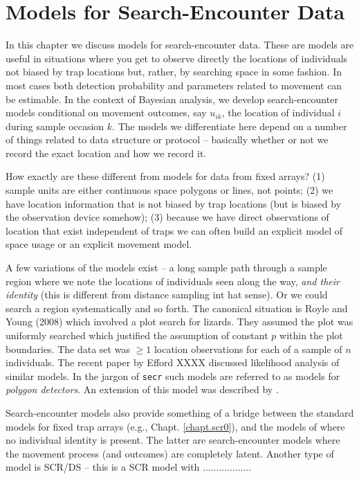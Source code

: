 \chapter{Models for  Search-Encounter Data}
\label{chapt.search-encounter}

\vspace{0.3cm}


In this chapter we discuss models for 
search-encounter data. These are models are useful in situations where
you get to observe directly the locations of 
individuals not biased by trap locations but,
rather, by searching space in some fashion. In most cases both
detection probability and parameters related to movement can be
estimable. In the context of Bayesian analysis, we develop
search-encounter models conditional on 
movement outcomes, say $u_{ik}$, the location of individual $i$ during
sample occasion $k$.
The models we differentiate here depend on a number of
things related to data structure or protocol -- basically whether or
not we record the exact location and how we record it. 


How exactly
are these different from models for data from fixed arrays?  (1)
sample units are either continuous space polygons or lines, not
points; (2) we have location information that is not biased by trap
locations (but is biased by the observation device somehow); (3)
because we have direct observations of location that exist independent
of traps we can often build an explicit model of space usage or an
explicit movement model.

A few variations of the models exist -- a long sample path through a
sample region where we note the locations of individuals seen along
the way, {\it and their identity} (this is different from distance
sampling int hat sense). Or we could search a region systematically
and so forth.  
The canonical situation is Royle and Young (2008) which involved a
plot search for lizards. They assumed the plot was uniformly searched
which justified the assumption of constant $p$ within the plot
boundaries. The data set was $\ge 1$ location observations for each of
a sample of $n$ individuals. 
The recent paper by Efford XXXX
discussed likelihood analysis of similar models. In the jargon of
\mbox{\tt secr} such models are referred to as models for {\it polygon detectors}.
 An extension of this model was described
by \citep{royle_etal:2011mee}.  

Search-encounter models also provide something of a bridge between the
standard models for fixed trap arrays (e.g., Chapt. \ref{chapt.scr0}),
and the models of \citep{chandler_royle:2012} where no individual
identity is present. The latter are search-encounter models where the
movement process (and outcomes) are completely latent. Another type of
model is SCR/DS -- this is a SCR model with ..................

